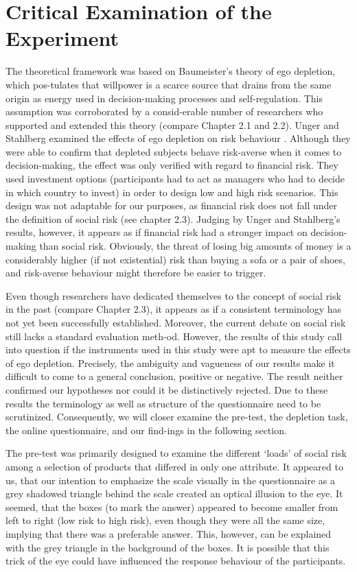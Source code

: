 \section{Critical Examination of the Experiment}
The theoretical framework was based on Baumeister’s theory of ego depletion, which pos-tulates that willpower is a scarce source that drains from the same origin as energy used in decision-making processes and self-regulation. This assumption was corroborated by a consid-erable number of researchers who supported and extended this theory (compare Chapter 2.1 and 2.2). Unger and Stahlberg examined the effects of ego depletion on risk behaviour \citep{unger2011ego}. Although they were able to confirm that depleted subjects behave risk-averse when it comes to decision-making, the effect was only verified with regard to financial risk. They used investment options (participants had to act as managers who had to decide in which country to invest) in order to design low and high risk scenarios. This design was not adaptable for our purposes, as financial risk does not fall under the definition of social risk (see chapter 2.3). Judging by Unger and Stahlberg’s results, however, it appears as if financial risk had a stronger impact on decision-making than social risk. Obviously, the threat of losing big amounts of money is a considerably higher (if not existential) risk than buying a sofa or a pair of shoes, and risk-averse behaviour might therefore be easier to trigger.\par
Even though researchers have dedicated themselves to the concept of social risk in the past (compare Chapter 2.3), it appears as if a consistent terminology has not yet been successfully established. Moreover, the current debate on social risk still lacks a standard evaluation meth-od. However, the results of this study call into question if the instruments used in this study were apt to measure the effects of ego depletion. Precisely, the ambiguity and vagueness of our results make it difficult to come to a general conclusion, positive or negative. The result neither confirmed our hypotheses nor could it be distinctively rejected.  Due to these results the terminology as well as structure of the questionnaire need to be scrutinized. Consequently, we will closer examine the pre-test, the depletion task, the online questionnaire, and our find-ings in the following section.\par
The pre-test was primarily designed to examine the different ‘loads’ of social risk among a selection of products that differed in only one attribute. It appeared to us, that our intention to emphasize the scale visually in the questionnaire as a grey shadowed triangle behind the scale created an optical illusion to the eye. It seemed, that the boxes (to mark the answer) appeared to become smaller from left to right (low risk to high risk), even though they were all the same size, implying that there was a preferable answer. This, however, can be explained with the grey triangle in the background of the boxes. It is possible that this trick of the eye could have influenced the response behaviour of the participants. \par

